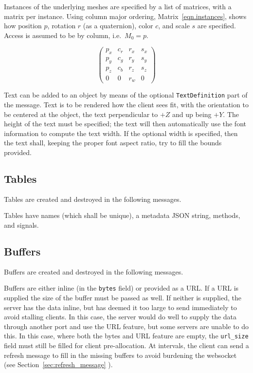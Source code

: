 \documentclass[11pt, oneside]{amsart}
\begin{document}
Instances of the underlying meshes are specified by a list of matrices, with a matrix per instance. Using column major ordering, Matrix~\ref{eqn.instances}, shows how position $p$, rotation $r$ (as a quaternion), color $c$, and scale $s$ are specified. Access is assumed to be by column, i.e.\ $M_0 = p$.

\begin{equation}
\label{eqn.instances}
\left(
\begin{array}{cccc}
p_x & c_r & r_x & s_x \\
p_y & c_g & r_y & s_y \\
p_z & c_b & r_z & s_z \\
0 & 0 & r_w & 0
\end{array}
\right)
\end{equation}

Text can be added to an object by means of the optional \texttt{TextDefinition} part of the message. Text is to be rendered how the client sees fit, with the orientation to be centered at the object, the text perpendicular to $+Z$ and up being $+Y$. The height of the text must be specified; the text will then automatically use the font information to compute the text width. If the optional width is specified, then the text shall, keeping the proper font aspect ratio, try to fill the bounds provided. 

\subsection{Tables}

Tables are created and destroyed in the following messages.



Tables have names (which shall be unique), a metadata JSON string, methods, and signals.

\subsection{Buffers}

Buffers are created and destroyed in the following messages.



Buffers are either inline (in the \texttt{bytes} field) or provided as a URL. If a URL is supplied the size of the buffer must be passed as well. If neither is supplied, the server has the data inline, but has deemed it too large to send immediately to avoid stalling clients. In this case, the server would do well to supply the data through another port and use the URL feature, but some servers are unable to do this. In this case, where both the bytes and URL feature are empty, the \texttt{url\_size} field must still be filled for client pre-allocation. At intervals, the client can send a refresh message to fill in the missing buffers to avoid burdening the websocket (see Section~\ref{sec:refresh_message} ).
\end{document}
